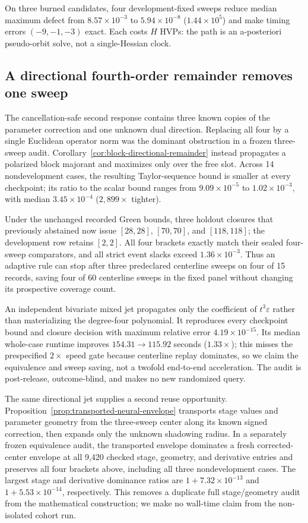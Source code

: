 \documentclass{article}
\begin{document}
On three burned candidates, four development-fixed sweeps reduce median maximum
defect from $8.57\times10^{-3}$ to $5.94\times10^{-8}$ ($1.44\times10^5$) and
make timing errors $(-9,-1,-3)$ exact.  Each costs $H$ HVPs: the path is an
a-posteriori pseudo-orbit solve, not a single-Hessian clock.

\subsection{A directional fourth-order remainder removes one sweep}
\label{sec:block-directional-result}

The cancellation-safe second response contains three known copies of the
parameter correction and one unknown dual direction.  Replacing all four by a
single Euclidean operator norm was the dominant obstruction in a frozen
three-sweep audit.  Corollary~\ref{cor:block-directional-remainder} instead
propagates a polarized block majorant and maximizes only over the free slot.
Across 14 nondevelopment cases, the resulting Taylor-sequence bound is smaller
at every checkpoint; its ratio to the scalar bound ranges from
$9.09\times10^{-5}$ to $1.02\times10^{-3}$, with median
$3.45\times10^{-4}$ ($2{,}899\times$ tighter).

Under the unchanged recorded Green bounds, three holdout closures that
previously abstained now issue $[28,28]$, $[70,70]$, and $[118,118]$; the
development row retains $[2,2]$.  All four brackets exactly match their sealed
four-sweep comparators, and all strict event slacks exceed
$1.36\times10^{-3}$.  Thus an adaptive rule can stop after three predeclared
centerline sweeps on four of 15 records, saving four of 60 centerline sweeps in
the fixed panel without changing its prospective coverage count.

An independent bivariate mixed jet propagates only the coefficient of
$t^3\varepsilon$ rather than materializing the degree-four polynomial.  It
reproduces every checkpoint bound and closure decision with maximum relative
error $4.19\times10^{-15}$.  Its median whole-case runtime improves
$154.31\to115.92$ seconds ($1.33\times$); this misses the prespecified
$2\times$ speed gate because centerline replay dominates, so we claim the
equivalence and sweep saving, not a twofold end-to-end acceleration.  The
audit is post-release, outcome-blind, and makes no new randomized query.

The same directional jet supplies a second reuse opportunity.
Proposition~\ref{prop:transported-neural-envelope} transports stage values and
parameter geometry from the three-sweep center along its known signed
correction, then expands only the unknown shadowing radius.  In a separately
frozen equivalence audit, the transported envelope dominates a fresh
corrected-center envelope at all 9,420 checked stage, geometry, and derivative
entries and preserves all four brackets above, including all three
nondevelopment cases.  The largest stage and derivative dominance ratios are
$1+7.32\times10^{-13}$ and $1+5.53\times10^{-14}$, respectively.  This removes
a duplicate full stage/geometry audit from the mathematical construction; we
make no wall-time claim from the non-isolated cohort run.
\end{document}
